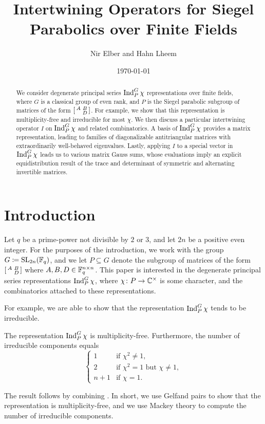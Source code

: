 \documentclass{amsart}
\title{Intertwining Operators for Siegel Parabolics over Finite Fields}
\author{Nir Elber and Hahn Lheem}
\date{\today}
\begin{document}
\begin{abstract}
    We consider degenerate principal series $\operatorname{Ind}_P^G\chi$ representations over finite fields, where $G$ is a classical group of even rank, and $P$ is the Siegel parabolic subgroup of matrices of the form $\begin{bsmallmatrix}
        A & B \\ & D
    \end{bsmallmatrix}$. For example, we show that this representation is multiplicity-free and irreducible for most $\chi$. We then discuss a particular intertwining operator $I$ on $\operatorname{Ind}_P^G\chi$ and related combinatorics. A basis of $\operatorname{Ind}_P^G\chi$ provides a matrix representation, leading to families of diagonalizable antitriangular matrices with extraordinarily well-behaved eigenvalues. Lastly, applying $I$ to a special vector in $\operatorname{Ind}_P^G\chi$ leads us to various matrix Gauss sums, whose evaluations imply an explicit equidistribution result of the trace and determinant of symmetric and alternating invertible matrices.
\end{abstract}

\maketitle


\tableofcontents

\section{Introduction}
Let $q$ be a prime-power not divisible by $2$ or $3$, and let $2n$ be a positive even integer. For the purposes of the introduction, we work with the group $G\coloneqq\operatorname{SL}_{2n}(\mathbb F_q)$, and we let $P\subseteq G$ denote the subgroup of matrices of the form $\begin{bsmallmatrix}
    A & B \\ & D
\end{bsmallmatrix}$ where $A,B,D\in\mathbb F_q^{n\times n}$. This paper is interested in the degenerate principal series representations $\operatorname{Ind}_P^G\chi$, where $\chi\colon P\to\mathbb C^\times$ is some character, and the combinatorics attached to these representations.

For example, we are able to show that the representation $\operatorname{Ind}_P^G\chi$ tends to be irreducible.
\begin{theorem}
    The representation $\operatorname{Ind}_P^G\chi$ is multiplicity-free. Furthermore, the number of irreducible components equals
    \[\begin{cases}
        1 & \text{if }\chi^2\ne1, \\
        2 & \text{if }\chi^2=1\text{ but }\chi\ne1, \\
        n+1 & \text{if }\chi=1.
    \end{cases}\]
\end{theorem}
The result follows by combining . In short, we use Gelfand pairs to show that the representation is multiplicity-free, and we use Mackey theory to compute the number of irreducible components.
\end{document}
